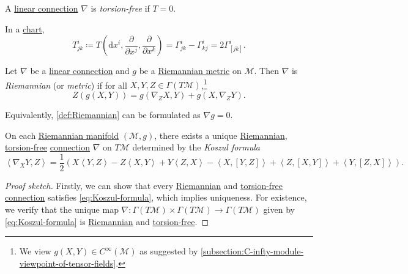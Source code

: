 \begin{definition}\label{def:torsion-free}
	A \hyperref[def:linear-connection]{linear connection} \(\nabla \) is \emph{torsion-free} if \(T = 0\).
\end{definition}

In a \hyperref[def:coordinate-chart]{chart},
\[
	T^i_{jk} \coloneqq T\left( \mathrm{d} x^i, \frac{\partial }{\partial x^j} , \frac{\partial }{\partial x^k} \right) = \Gamma ^i_{jk} - \Gamma ^i_{kj} = 2\Gamma ^i_{[jk]}.
\]

\begin{definition}[Riemannian]\label{def:Riemannian}
	Let \(\nabla \) be a \hyperref[def:linear-connection]{linear connection} and \(g\) be a \hyperref[def:Riemannian-metric]{Riemannian metric} on \(\mathcal{M} \). Then \(\nabla \) is \emph{Riemannian} (or \emph{metric}) if for all \(X, Y, Z\in \Gamma (T\mathcal{M} )\),\footnote{We view \(g(X, Y)\in C^{\infty} (\mathcal{M} )\) as suggested by \autoref{subsection:C-infty-module-viewpoint-of-tensor-fields}.}
	\[
		Z(g(X, Y)) = g(\nabla _{Z} X, Y) + g(X, \nabla _{Z} Y).
	\]
\end{definition}

\begin{remark}
	Equivalently, \autoref{def:Riemannian} can be formulated as \(\nabla g = 0\).
\end{remark}

\begin{proposition}\label{prop:Koszul-formula}
	On each \hyperref[def:Riemannian-manifold]{Riemannian manifold} \((\mathcal{M} , g)\), there exists a unique \hyperref[def:Riemannian]{Riemannian}, \hyperref[def:torsion-free]{torsion-free} \hyperref[def:linear-connection]{connection} \(\nabla \) on \(T\mathcal{M} \) determined by the \emph{Koszul formula}
	\begin{equation}\label{eq:Koszul-formula}
		\left\langle \nabla _X Y, Z \right\rangle = \frac{1}{2} \left( X \left\langle Y, Z \right\rangle - Z\left\langle X, Y \right\rangle + Y\left\langle Z, X \right\rangle - \left\langle X, [Y, Z] \right\rangle + \left\langle Z, [X, Y] \right\rangle + \left\langle Y, [Z, X] \right\rangle \right).
	\end{equation}
\end{proposition}
\begin{proof}[Proof sketch]
	Firstly, we can show that every \hyperref[def:Riemannian]{Riemannian} and \hyperref[def:torsion-free]{torsion-free} \hyperref[def:linear-connection]{connection} satisfies \autoref{eq:Koszul-formula}, which implies uniqueness. For existence, we verify that the unique map \(\nabla \colon \Gamma (T \mathcal{M} ) \times \Gamma (T \mathcal{M} )\to \Gamma (T\mathcal{M} )\) given by \autoref{eq:Koszul-formula} is \hyperref[def:Riemannian]{Riemannian} and \hyperref[def:torsion-free]{torsion-free}.
\end{proof}

